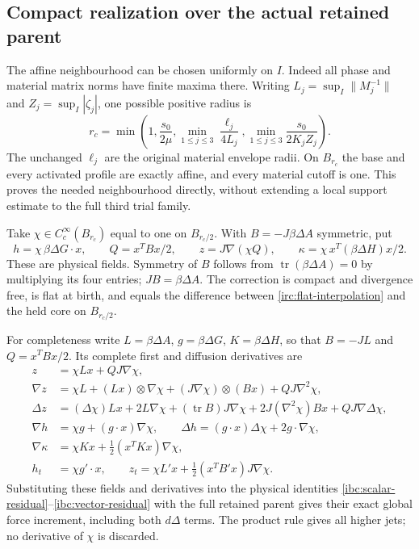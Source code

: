 \subsection{Compact realization over the actual retained parent}

The affine neighbourhood can be chosen uniformly on $I$.
Indeed all phase and material matrix norms have finite maxima there.
Writing $L_j=\sup_I\|M_j^{-1}\|$ and
$Z_j=\sup_I|\zeta_j|$, one possible positive radius is
\[
 r_c=\min\left(1,\frac{s_0}{2\mu},
       \min_{1\leq j\leq3}\frac{\ell_j}{4L_j},
       \min_{1\leq j\leq3}\frac{s_0}{2K_jZ_j}\right).
\]
The unchanged $\ell_j$ are the original material envelope radii.
On $B_{r_c}$ the base and every activated profile are exactly
affine, and every material cutoff is one.  This proves the needed
neighbourhood directly, without extending a local support estimate
to the full third trial family.

Take $\chi\in C_c^\infty(B_{r_c})$ equal to one on
$B_{r_c/2}$.  With $B=-J\beta\Delta A$ symmetric, put
\begin{equation}\label{irc:compact-correction}
 h=\chi\,\beta\Delta G\cdot x,\qquad
 Q=x^TBx/2,\qquad z=J\nabla(\chi Q),\qquad
 \kappa=\chi\,x^T(\beta\Delta H)x/2.
\end{equation}
These are physical fields.  Symmetry of $B$ follows from
$\operatorname{tr}(\beta\Delta A)=0$ by multiplying its four
entries; $J B=\beta\Delta A$.
The correction is compact and divergence free, is flat at birth,
and equals the difference between \eqref{irc:flat-interpolation}
and the held core on $B_{r_c/2}$.

For completeness write $L=\beta\Delta A$, $g=\beta\Delta G$,
$K=\beta\Delta H$, so that $B=-JL$ and $Q=x^TBx/2$.
Its complete first and diffusion derivatives are
\begin{align}
 z&=\chi Lx+QJ\nabla\chi,\nonumber\\
 \nabla z&=\chi L+(Lx)\otimes\nabla\chi
          +(J\nabla\chi)\otimes(Bx)+QJ\nabla^2\chi,
 \label{irc:cutoff-gradient}\\
 \Delta z&=(\Delta\chi)Lx+2L\nabla\chi
          +(\operatorname{tr}B)J\nabla\chi
          +2J(\nabla^2\chi)Bx+QJ\nabla\Delta\chi,
 \label{irc:cutoff-laplacian}\\
 \nabla h&=\chi g+(g\cdot x)\nabla\chi,\qquad
 \Delta h=(g\cdot x)\Delta\chi+2g\cdot\nabla\chi,\nonumber\\
 \nabla\kappa&=\chi Kx+\tfrac12(x^TKx)\nabla\chi,\nonumber\\
 h_t&=\chi g'\cdot x,\qquad
 z_t=\chi L'x+\tfrac12(x^TB'x)J\nabla\chi.
 \label{irc:cutoff-time}
\end{align}
Substituting these fields and derivatives into the physical
identities \eqref{ibc:scalar-residual}--\eqref{ibc:vector-residual}
with the full retained parent gives their exact global force
increment, including both $d\Delta$ terms.  The product rule
gives all higher jets; no derivative of $\chi$ is discarded.

